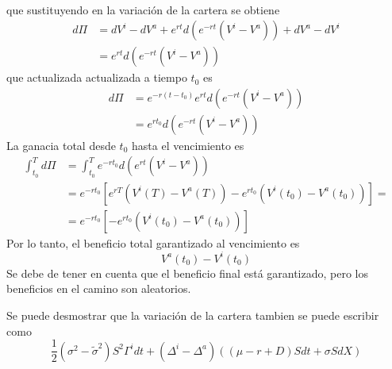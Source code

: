 \begin{itemize}
\begin{align*}
    \end{align*}
    que sustituyendo en la variación de la cartera se obtiene
    \begin{align*}
        d\Pi &= dV^i - dV^a + e^{rt}d(e^{-rt}(V^i - V^a)) + dV^a - dV^i \\
        &= e^{rt}d(e^{-rt}(V^i - V^a))
    \end{align*}
    que actualizada actualizada a tiempo $t_0$ es
    \begin{align*}
        d\Pi &= e^{-r(t-t_0)}e^{rt}d(e^{-rt}(V^i - V^a)) \\
        &= e^{rt_0}d(e^{-rt}(V^i - V^a))
    \end{align*}
    La ganacia total desde $t_0$ hasta el vencimiento es
    \begin{align*}
        \int_{t_0}^T d\Pi &= \int_{t_0}^T e^{-rt_0}d(e^{rt}(V^i - V^a))\\
        &= e^{-rt_0}\left[ e^{rT}(V^i(T) - V^a(T)) - e^{rt_0}(V^i(t_0) - V^a(t_0))\right] = \\
        &= e^{-rt_0}\left[ - e^{rt_0}(V^i(t_0) - V^a(t_0))\right]
    \end{align*}
    Por lo tanto, el beneficio total garantizado al vencimiento es
    \[
        \boxed{V^a(t_0) - V^i(t_0) }
    \]
    Se debe de tener en cuenta que el beneficio final está garantizado, pero los beneficios en el camino son aleatorios.

    Se puede desmostrar que la variación de la cartera tambien se puede escribir como
    \[
        \frac{1}{2}(\sigma^2 - \tilde{\sigma}^2)S^2 \Gamma^i dt + (\Delta^i - \Delta^a)\left((\mu - r + D)S dt + \sigma S dX\right)
    \]
    

\end{itemize}
